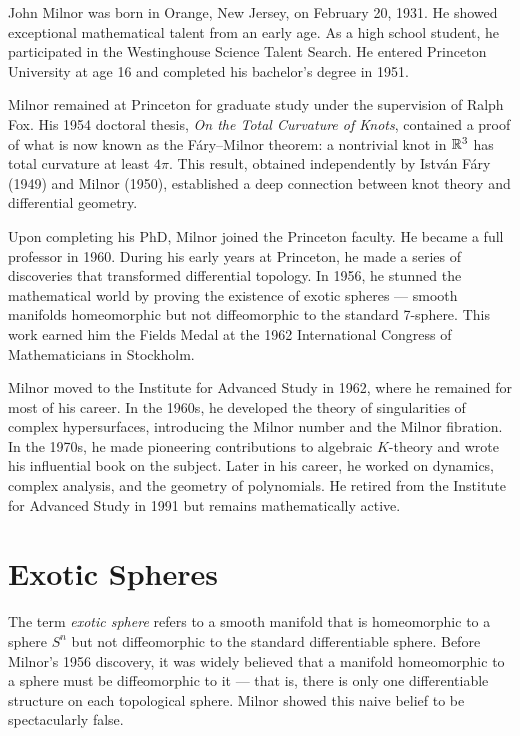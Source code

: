 John Milnor was born in Orange, New Jersey, on February 20, 1931. He showed exceptional mathematical talent from an early age. As a high school student, he participated in the Westinghouse Science Talent Search. He entered Princeton University at age 16 and completed his bachelor's degree in 1951.

Milnor remained at Princeton for graduate study under the supervision of Ralph Fox. His 1954 doctoral thesis, \textit{On the Total Curvature of Knots}, contained a proof of what is now known as the F\'ary--Milnor theorem: a nontrivial knot in \(\mathbb{R}^3\) has total curvature at least \(4\pi\). This result, obtained independently by Istv\'an F\'ary (1949) and Milnor (1950), established a deep connection between knot theory and differential geometry.

Upon completing his PhD, Milnor joined the Princeton faculty. He became a full professor in 1960. During his early years at Princeton, he made a series of discoveries that transformed differential topology. In 1956, he stunned the mathematical world by proving the existence of exotic spheres --- smooth manifolds homeomorphic but not diffeomorphic to the standard 7-sphere. This work earned him the Fields Medal at the 1962 International Congress of Mathematicians in Stockholm.

Milnor moved to the Institute for Advanced Study in 1962, where he remained for most of his career. In the 1960s, he developed the theory of singularities of complex hypersurfaces, introducing the Milnor number and the Milnor fibration. In the 1970s, he made pioneering contributions to algebraic \(K\)-theory and wrote his influential book on the subject. Later in his career, he worked on dynamics, complex analysis, and the geometry of polynomials. He retired from the Institute for Advanced Study in 1991 but remains mathematically active.

\section{Exotic Spheres}

The term \textit{exotic sphere} refers to a smooth manifold that is homeomorphic to a sphere \(S^n\) but not diffeomorphic to the standard differentiable sphere. Before Milnor's 1956 discovery, it was widely believed that a manifold homeomorphic to a sphere must be diffeomorphic to it --- that is, there is only one differentiable structure on each topological sphere. Milnor showed this naive belief to be spectacularly false.

